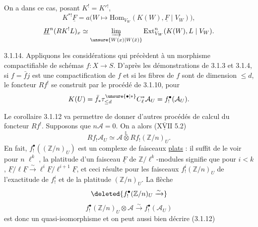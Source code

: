 On a dans ce cas, posant $K^!=K'{}^!$,
\[
 K^{* !}\underline F=a\bigl(W\longmapsto\mathrm{Hom}_{V_W}(K(W),\underline F\mid V_W)\bigr),
\]
\[
 \underline H^n(RK^!L)_x\simeq\underset{\unsure{W(x)|W(\bar x)}}{\underrightarrow{\lim}}\,
 \mathrm{Ext}^n_{V_W}(K(W),L\mid V_W).
\]

3.1.14. Appliquons les considérations qui précèdent à un morphisme compactifiable de schémas $f:X\longrightarrow S$.
D'après les démonstrations de 3.1.3 et 3.1.4, si $f=\bar f j$ est une compactification de $f$ et si les fibres de $f$ sont de dimension $\leq d$, le foncteur $Rf^!$ se construit par le procédé de 3.1.10, pour
\[
 K(U)=\bar f_*\tau^{\unsure{\bullet|*}}_{\leq d}C^{*}_{\ell}\mathcal A_U=f_!^\bullet(\mathcal A_U).
\]

Le corollaire 3.1.12 va permettre de donner d'autres procédés de calcul\unsure{/} du foncteur $Rf^!$. Supposons que $n\mathcal A=0$. On a alors ($\overline{\underline{\mathrm{XVII}}}$ 5.2)
\[
 Rf_!\mathcal A_U\simeq\mathcal A\overset{\mathbb L}{\otimes}Rf_!(\mathbb Z/n)_U.
\]
En fait, $f_!^\bullet((\mathbb Z/n)_U)$ est un complexe de faisceaux \uline{plats} : il suffit de le voir pour $n$\deleted{$=$} $\ell^k$ ,  la platitude  d'un faisceau $\underline F$  de $\mathbb Z/\ell^k$-modules signifie que pour $i<k$, $\underline F/\ell\underline F\xrightarrow{\sim}\ell^i\underline F/\ell^{i+1}\underline F$, et ceci résulte pour les faisceaux $f_!^i(\mathbb Z/n)_U$ de l'exactitude de $f_!^i$ et de la platitude  $(\mathbb Z/n)_U$.
 La flèche 
\[
 \deleted{f_!^\bullet(\mathbb Z/n)_U\xrightarrow{\sim}}
\]
\[
 f_!^\bullet(\mathbb Z/n)_U\otimes\mathcal A\xrightarrow{\sim}f_!^\bullet(\mathcal A_U)
\]
est donc un quasi-isomorphisme et on peut aussi bien décrire (3.1.12)
